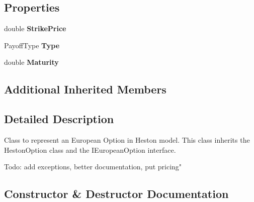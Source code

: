\subsection*{Properties}
\begin{DoxyCompactItemize}
\item 
\mbox{\label{class_heston_model_1_1_classes_1_1_european_option_formula_aebbcb7288cb36e6411d2f4e6b8b92753}} 
double {\bfseries Strike\+Price}
\item 
\mbox{\label{class_heston_model_1_1_classes_1_1_european_option_formula_a5355ce1192256ec1c34f8d079fcaf80d}} 
Payoff\+Type {\bfseries Type}
\item 
\mbox{\label{class_heston_model_1_1_classes_1_1_european_option_formula_a067d6fd78fdfcb33fd12476ee83f6eca}} 
double {\bfseries Maturity}
\end{DoxyCompactItemize}
\subsection*{Additional Inherited Members}


\subsection{Detailed Description}
Class to represent an European Option in Heston model. This class inherits the Heston\+Option class and the I\+European\+Option interface. 

Todo\+: add exceptions, better documentation, put pricing" 

\subsection{Constructor \& Destructor Documentation}
\mbox{\label{class_heston_model_1_1_classes_1_1_european_option_formula_a3350d3acf23c4c0c750c966b1b54f5b4}} 
